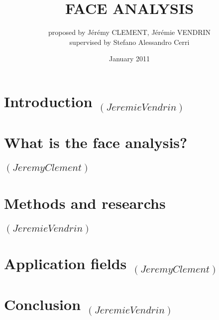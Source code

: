\documentclass[a4paper, 11pt,twocolumn]{IEEEtran}
\date{January 2011}
\title{FACE ANALYSIS}
\author{proposed by Jérémy CLEMENT, Jérémie VENDRIN\\ supervised by Stefano Alessandro Cerri }
\begin{document}
	\maketitle
	\thispagestyle{fancy}
	
	\begin{abstract}
		
	\end{abstract}

	\section{Introduction $_{(Jeremie Vendrin)}$}
	

	\section{What is the face analysis? $_{(Jeremy Clement)}$}
	

	\section{Methods and researchs $_{(Jeremie Vendrin)}$}
	

	\section{Application fields $_{(Jeremy Clement)}$}
	

	\section*{Conclusion $_{(Jeremie Vendrin)}$}
	

	\cite{NPIA}
	\cite{nyuLucasHelen}
\newpage
\begin{onecolumn}
	
	
\end{onecolumn}
\end{document}
